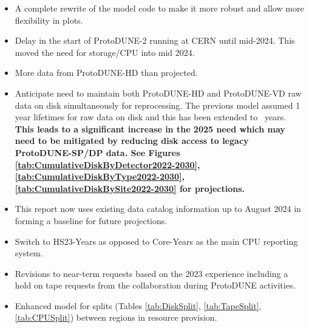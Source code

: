 \documentclass[12pt]{article}
\begin{document}
\begin{itemize}
\item A complete rewrite of the model code to make it more robust and allow more flexibility in plots. 
\item Delay in the start of ProtoDUNE-2 running at CERN until mid-2024. This moved the need for storage/CPU into mid 2024.  
\item More data from ProtoDUNE-HD than projected.  
\item Anticipate need to maintain both ProtoDUNE-HD and ProtoDUNE-VD raw data on disk simultaneously  for reprocessing.  The previous model assumed 1 year lifetimes for raw data on disk and this has been extended to \configRawDataDiskLifetimes\ years.  {\bf This leads to a significant increase in the 2025 need which may need to be mitigated by reducing disk access to legacy ProtoDUNE-SP/DP data.
See Figures  \ref{tab:CumulativeDiskByDetector2022-2030}, \ref{tab:CumulativeDiskByType2022-2030}, \ref{tab:CumulativeDiskBySite2022-2030} for projections.  }
\item This report now uses existing data catalog information up to August 2024 in forming a baseline for future projections. 
\item Switch to HS23-Years as opposed to Core-Years as the main CPU reporting system.
\item Revisions to near-term requests based on the 2023 experience including a hold on tape requests from the collaboration during ProtoDUNE activities. 
\item Enhanced model for splits (Tables \ref{tab:DiskSplit}, \ref{tab:TapeSplit}, \ref{tab:CPUSplit}) between regions in resource provision. 
\end{itemize}
\end{document}
